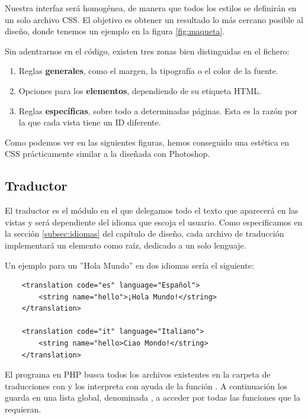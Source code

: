 Nuestra interfaz será homogénea, de manera que todos los estilos se definirán en un solo archivo \acrshort{CSS}. El objetivo es obtener un resultado lo más cercano posible al diseño, donde tenemos un ejemplo en la figura \ref{fig:maqueta}.

Sin adentrarnos en el código, existen tres zonas bien distinguidas en el fichero:

\begin{enumerate}
	\item Reglas \textbf{generales}, como el margen, la tipografía o el color de la fuente.
	\item Opciones para los \textbf{elementos}, dependiendo de su etiqueta \acrshort{HTML}.
	\item Reglas \textbf{específicas}, sobre todo a determinadas páginas. Esta es la razón por la que cada vista tiene un ID diferente.
\end{enumerate}

Como podemos ver en las siguientes figuras, hemos conseguido una estética en \acrshort{CSS} prácticamente similar a la diseñada con Photoshop.

\subsection{Traductor}

El traductor es el módulo en el que delegamos todo el texto que aparecerá en las vistas y será dependiente del idioma que escoja el usuario. Como especificamos en la sección \ref{subsec:idiomas} del capítulo de diseño, cada archivo de traducción implementará un elemento  como raíz, dedicado a un solo lenguaje.

Un ejemplo para un ''Hola Mundo'' en dos idiomas sería el siguiente:

\begin{verbatim}
	<translation code="es" language="Español">
	    <string name="hello">¡Hola Mundo!</string>
	</translation>

	<translation code="it" language="Italiano">
	    <string name="hello>Ciao Mondo!</string>
	</translation>
\end{verbatim}

El programa en PHP busca todos los archivos existentes en la carpeta de traducciones con  y los interpreta con ayuda de la función . A continuación los guarda en una lista global, denominada , a acceder por todas las funciones que la requieran.

